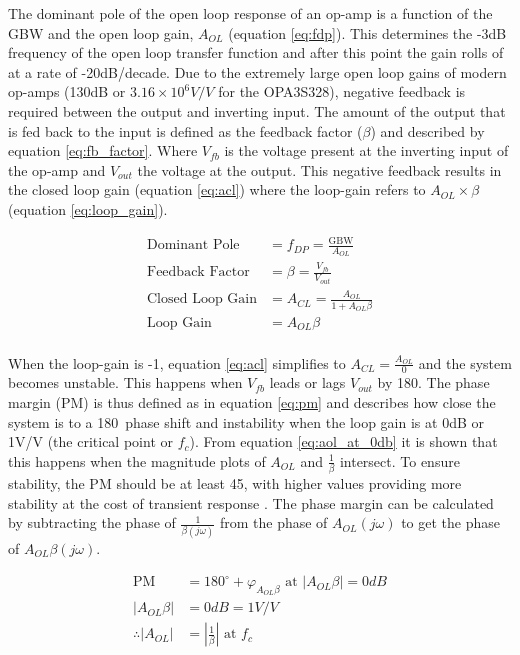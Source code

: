 The dominant pole of the open loop response of an op-amp is a function of the GBW and the open loop gain, $A_{OL}$ (equation \ref{eq:fdp}). This determines the -3dB frequency of the open loop transfer function and after this point the gain rolls of at a rate of -20dB/decade. Due to the extremely large open loop gains of modern op-amps (130dB or $3.16 \times 10^6 V/V$ for the OPA3S328), negative feedback is required between the output and inverting input. The amount of the output that is fed back to the input is defined as the feedback factor ($\beta$) and described by equation \ref{eq:fb_factor}. Where $V_{fb}$ is the voltage present at the inverting input of the op-amp and $V_{out}$ the voltage at the output. This negative feedback results in the closed loop gain (equation \ref{eq:acl}) where the loop-gain refers to $A_{OL}\times\beta$ (equation \ref{eq:loop_gain}).

\begin{align}
    \text{Dominant Pole} &= f_{DP} = \frac{\text{GBW}}{A_{OL}} \label{eq:fdp}\\
    \text{Feedback Factor} &= \beta = \frac{V_{fb}}{V_{out}}  \label{eq:fb_factor}\\
    \text{Closed Loop Gain} &= A_{CL} = \frac{A_{OL}}{1 + A_{OL}\beta} \label{eq:acl}\\
    \text{Loop Gain} &= A_{OL}\beta \label{eq:loop_gain}\\
\end{align}

When the loop-gain is -1, equation \ref{eq:acl} simplifies to $A_{CL} = \frac{A_{OL}}{0}$ and the system becomes unstable. This happens when $V_{fb}$ leads or lags $V_{out}$ by 180\textdegree. The phase margin (PM) is thus defined as in equation \ref{eq:pm} and describes how close the system is to a 180\textdegree\ phase shift and instability when the loop gain is at 0dB or 1V/V (the critical point or $f_c$). From equation \ref{eq:aol_at_0db} it is shown that this happens when the magnitude plots of $A_{OL}$ and $\frac{1}{\beta}$ intersect. To ensure stability, the PM should be at least 45\textdegree, with higher values providing more stability at the cost of transient response \cite{StabilizeYourTransimpedance}. The phase margin can be calculated by subtracting the phase of $\frac{1}{\beta(j\omega)}$ from the phase of $A_{OL}(j\omega)$ to get the phase of $A_{OL}\beta(j\omega)$.

\begin{align}
    \text{PM} &= 180^\circ + \varphi_{A_{OL}\beta} \text{ at } |A_{OL}\beta| = 0dB \label{eq:pm} \\
    |A_{OL}\beta| &= 0dB = 1 V/V\\
    \therefore |A_{OL}| &= |\frac{1}{\beta}| \text{ at } f_c \label{eq:aol_at_0db}
\end{align}


